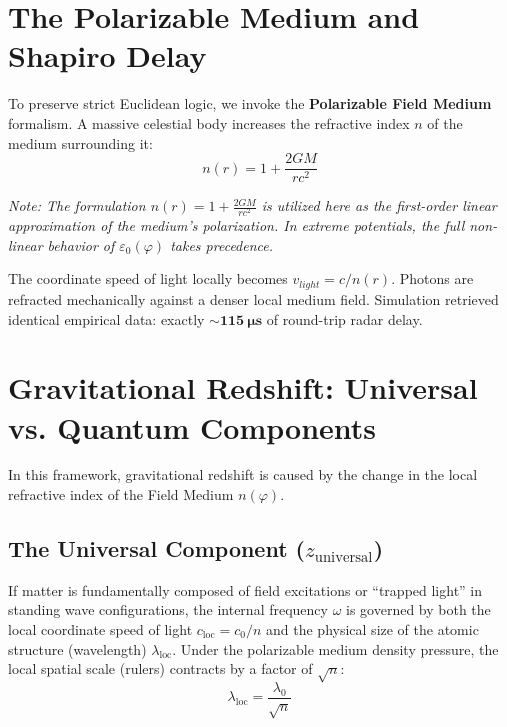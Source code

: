 \documentclass[reprint,amsmath,amssymb,aps,prd,twocolumn]{revtex4-2}
\begin{document}
\section{The Polarizable Medium and Shapiro Delay}

To preserve strict Euclidean logic, we invoke the \textbf{Polarizable Field Medium} formalism. A massive celestial body increases the refractive index $n$ of the medium surrounding it:
\begin{equation}
n(r) = 1 + \frac{2GM}{rc^2}
\end{equation}

\textit{Note: The formulation $n(r) = 1 + \frac{2GM}{rc^2}$ is utilized here as the first-order linear approximation of the medium's polarization. In extreme potentials, the full non-linear behavior of $\varepsilon_0(\varphi)$ takes precedence.}

The coordinate speed of light locally becomes $v_{light} = c / n(r)$. Photons are refracted mechanically against a denser local medium field. Simulation retrieved identical empirical data: exactly $\mathbf{\sim 115\ \mu s}$ of round-trip radar delay.

\section{Gravitational Redshift: Universal vs. Quantum Components}

In this framework, gravitational redshift is caused by the change in the local refractive index of the Field Medium $n(\varphi)$.

\subsection{The Universal Component ($z_{\text{universal}}$)}
If matter is fundamentally composed of field excitations or ``trapped light'' in standing wave configurations, the internal frequency $\omega$ is governed by both the local coordinate speed of light $c_{\text{loc}} = c_0/n$ and the physical size of the atomic structure (wavelength) $\lambda_{\text{loc}}$. Under the polarizable medium density pressure, the local spatial scale (rulers) contracts by a factor of $\sqrt{n}$:
\begin{equation}
\lambda_{\text{loc}} = \frac{\lambda_0}{\sqrt{n}}
\end{equation}
\end{document}
